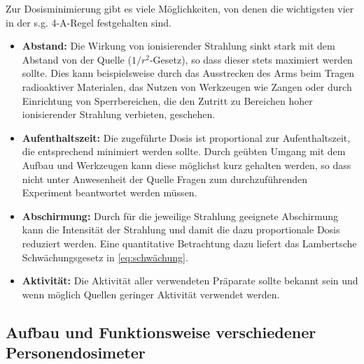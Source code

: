 \documentclass[11pt, a4paper]{article}
\numberwithin{equation}{section}
\begin{document}
Zur Dosisminimierung gibt es viele Möglichkeiten, von denen die wichtigsten vier in der s.g. 4-A-Regel festgehalten sind.
\begin{itemize}
	\item \textbf{Abstand:}
	Die Wirkung von ionisierender Strahlung sinkt stark mit dem Abstand von der Quelle ($1/r^2$-Gesetz), so dass dieser stets maximiert werden sollte.
	Dies kann beispielsweise durch das Ausstrecken des Arms beim Tragen radioaktiver Materialen, das Nutzen von Werkzeugen wie Zangen oder durch Einrichtung von Sperrbereichen, die den Zutritt zu Bereichen hoher ionisierender Strahlung verbieten, geschehen.	
	
	\item \textbf{Aufenthaltszeit:}
	Die zugeführte Dosis ist proportional zur Aufenthaltszeit, die entsprechend minimiert werden sollte.
	Durch geübten Umgang mit dem Aufbau und Werkzeugen kann diese möglichst kurz gehalten werden, so dass nicht unter Anwesenheit der Quelle Fragen zum durchzuführenden Experiment beantwortet werden müssen.	
	
	\item \textbf{Abschirmung:}
	Durch für die jeweilige Strahlung geeignete Abschirmung kann die Intensität der Strahlung und damit die dazu proportionale Dosis reduziert werden.
	Eine quantitative Betrachtung dazu liefert das Lambertsche Schwächungsgesetz in \eqref{eq:schwächung}.		
	
	\item \textbf{Aktivität:}
	Die Aktivität aller verwendeten Präparate sollte bekannt sein und wenn möglich Quellen geringer Aktivität verwendet werden.

\end{itemize}


\subsection{Aufbau und Funktionsweise verschiedener Personendosimeter}
\end{document}
